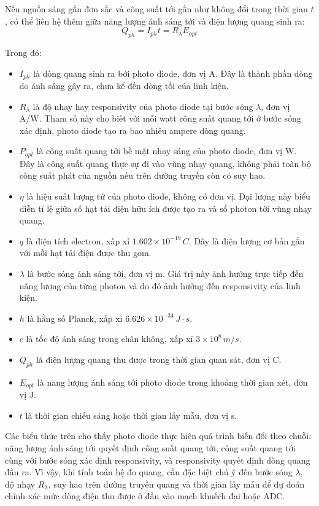 Nếu nguồn sáng gần đơn sắc và công suất tới gần như không đổi trong thời gian \(t\), có thể liên hệ thêm giữa năng lượng ánh sáng tới và điện lượng quang sinh ra:
\begin{equation}
Q_{ph} = I_{ph} t = R_{\lambda} E_{opt}
\end{equation}

Trong đó:
\begin{itemize}
    \item \(I_{ph}\) là dòng quang sinh ra bởi photo diode, đơn vị A. Đây là thành phần dòng do ánh sáng gây ra, chưa kể đến dòng tối của linh kiện.
    \item \(R_{\lambda}\) là độ nhạy hay responsivity của photo diode tại bước sóng \(\lambda\), đơn vị A/W. Tham số này cho biết với mỗi watt công suất quang tới ở bước sóng xác định, photo diode tạo ra bao nhiêu ampere dòng quang.
    \item \(P_{opt}\) là công suất quang tới bề mặt nhạy sáng của photo diode, đơn vị W. Đây là công suất quang thực sự đi vào vùng nhạy quang, không phải toàn bộ công suất phát của nguồn nếu trên đường truyền còn có suy hao.
    \item \(\eta\) là hiệu suất lượng tử của photo diode, không có đơn vị. Đại lượng này biểu diễn tỉ lệ giữa số hạt tải điện hữu ích được tạo ra và số photon tới vùng nhạy quang.
    \item \(q\) là điện tích electron, xấp xỉ \(1.602\times10^{-19}\,C\). Đây là điện lượng cơ bản gắn với mỗi hạt tải điện được thu gom.
    \item \(\lambda\) là bước sóng ánh sáng tới, đơn vị m. Giá trị này ảnh hưởng trực tiếp đến năng lượng của từng photon và do đó ảnh hưởng đến responsivity của linh kiện.
    \item \(h\) là hằng số Planck, xấp xỉ \(6.626\times10^{-34}\,J\cdot s\).
    \item \(c\) là tốc độ ánh sáng trong chân không, xấp xỉ \(3\times10^8\,m/s\).
    \item \(Q_{ph}\) là điện lượng quang thu được trong thời gian quan sát, đơn vị C.
    \item \(E_{opt}\) là năng lượng ánh sáng tới photo diode trong khoảng thời gian xét, đơn vị J.
    \item \(t\) là thời gian chiếu sáng hoặc thời gian lấy mẫu, đơn vị s.
\end{itemize}

Các biểu thức trên cho thấy photo diode thực hiện quá trình biến đổi theo chuỗi: năng lượng ánh sáng tới quyết định công suất quang tới, công suất quang tới cùng với bước sóng xác định responsivity, và responsivity quyết định dòng quang đầu ra. Vì vậy, khi tính toán hệ đo quang, cần đặc biệt chú ý đến bước sóng \(\lambda\), độ nhạy \(R_{\lambda}\), suy hao trên đường truyền quang và thời gian lấy mẫu để dự đoán chính xác mức dòng điện thu được ở đầu vào mạch khuếch đại hoặc ADC.

